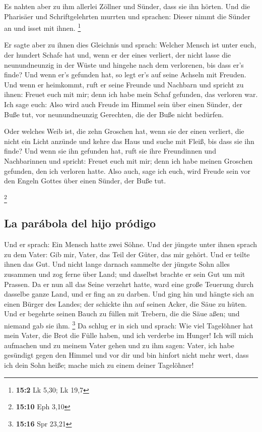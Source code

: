  Es nahten aber zu ihm allerlei Zöllner und Sünder, dass
sie ihn hörten.  Und die Pharisäer und Schriftgelehrten
murrten und sprachen: Dieser nimmt die Sünder an und isset mit ihnen.
\footnote{\textbf{15:2} Lk 5,30; Lk 19,7}

 Er sagte aber zu ihnen dies Gleichnis und sprach:
 Welcher Mensch ist unter euch, der hundert Schafe hat
und, wenn er der eines verliert, der nicht lasse die neunundneunzig in
der Wüste und hingehe nach dem verlorenen, bis dass er's finde?
 Und wenn er's gefunden hat, so legt er's auf seine
Achseln mit Freuden.  Und wenn er heimkommt, ruft er seine
Freunde und Nachbarn und spricht zu ihnen: Freuet euch mit mir; denn ich
habe mein Schaf gefunden, das verloren war.  Ich sage
euch: Also wird auch Freude im Himmel sein über einen Sünder, der Buße
tut, vor neunundneunzig Gerechten, die der Buße nicht bedürfen.

 Oder welches Weib ist, die zehn Groschen hat, wenn sie
der einen verliert, die nicht ein Licht anzünde und kehre das Haus und
suche mit Fleiß, bis dass sie ihn finde?  Und wenn sie ihn
gefunden hat, ruft sie ihre Freundinnen und Nachbarinnen und spricht:
Freuet euch mit mir; denn ich habe meinen Groschen gefunden, den ich
verloren hatte.  Also auch, sage ich euch, wird Freude
sein vor den Engeln Gottes über einen Sünder, der Buße tut.

\footnote{\textbf{15:10} Eph 3,10}

\hypertarget{la-paruxe1bola-del-hijo-pruxf3digo}{%
\subsection{La parábola del hijo
pródigo}\label{la-paruxe1bola-del-hijo-pruxf3digo}}

 Und er sprach: Ein Mensch hatte zwei Söhne.
 Und der jüngste unter ihnen sprach zu dem Vater: Gib
mir, Vater, das Teil der Güter, das mir gehört. Und er teilte ihnen das
Gut.  Und nicht lange darnach sammelte der jüngste Sohn
alles zusammen und zog ferne über Land; und daselbst brachte er sein Gut
um mit Prassen.  Da er nun all das Seine verzehrt hatte,
ward eine große Teuerung durch dasselbe ganze Land, und er fing an zu
darben.  Und ging hin und hängte sich an einen Bürger des
Landes; der schickte ihn auf seinen Acker, die Säue zu hüten.
 Und er begehrte seinen Bauch zu füllen mit Trebern, die
die Säue aßen; und niemand gab sie ihm. \footnote{\textbf{15:16} Spr
  23,21}  Da schlug er in sich und sprach: Wie viel
Tagelöhner hat mein Vater, die Brot die Fülle haben, und ich verderbe im
Hunger!  Ich will mich aufmachen und zu meinem Vater
gehen und zu ihm sagen: Vater, ich habe gesündigt gegen den Himmel und
vor dir  und bin hinfort nicht mehr wert, dass ich dein
Sohn heiße; mache mich zu einem deiner Tagelöhner!

